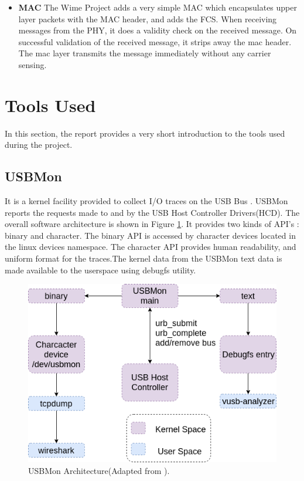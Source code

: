 \begin{itemize}
\item{\textbf{MAC} The Wime Project adds a very simple MAC which encapsulates upper layer packets with the MAC header, and adds the \ac{FCS}.
When receiving messages from the \ac{PHY}, it does a validity check on the received message.
On successful validation of the received message, it strips away the \ac{mac} header.
The \ac{mac} layer transmits the message immediately without any carrier sensing.}
\end{itemize}

\section{Tools Used}
In this section, the report provides a very short introduction to the tools used during the project. 

\subsection{USBMon}
It is a kernel facility provided to collect I/O traces on the USB Bus \cite{_usbmon}. USBMon reports the requests made to and by the USB Host Controller Drivers(HCD).
The overall software architecture is shown in Figure \ref{usbmon_arch}.
It provides two kinds of API's : binary and character. The binary API is accessed by character devices located in the linux devices namespace. The character API provides human readability, and uniform format for the traces.The kernel data from the USBMon text data is made available to the userspace using debugfs \cite{_debugfs} utility.

\begin{figure}[h!]
\centering
\includegraphics[width=\textwidth]{Figure/USBMon.png}
\caption{USBMon Architecture(Adapted from \cite{basak_usb_2018}).}
\label{usbmon_arch}
\end{figure}


